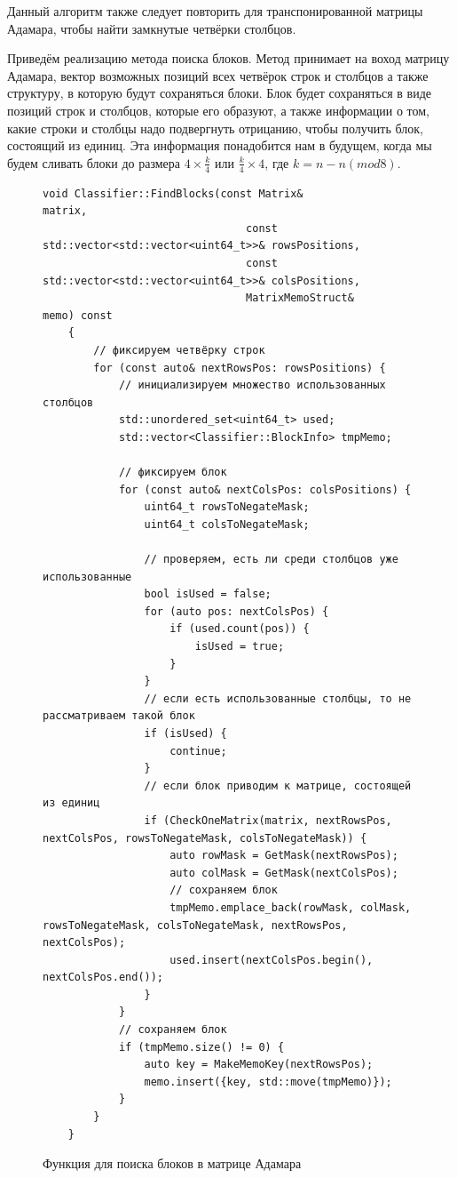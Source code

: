 \documentclass[a4paper, 14pt]{extreport}
\begin{document}
Данный алгоритм также следует повторить для транспонированной матрицы Адамара, чтобы найти замкнутые четвёрки столбцов.

Приведём реализацию метода поиска блоков. Метод принимает на воход матрицу Адамара, вектор возможных позиций всех четвёрок строк и столбцов а также структуру, в которую будут сохраняться блоки. Блок будет сохраняться в виде позиций строк и столбцов, которые его образуют, а также информации о том, какие строки и столбцы надо подвергнуть отрицанию, чтобы получить блок, состоящий из единиц. Эта информация понадобится нам в будущем, когда мы будем сливать блоки до размера $4 \times \frac{k}{4}$ или $\frac{k}{4} \times 4$, где $k = n - n(mod8)$.
\begin{figure}[H]
    \centering
    \begin{minipage}{\linewidth}
    \begin{lstlisting}[language=С++, tabsize=4, showspaces=false, basicstyle=\fontsize{9.5}{11.5}\selectfont, numbers=none]
    void Classifier::FindBlocks(const Matrix&                             matrix,
                                const std::vector<std::vector<uint64_t>>& rowsPositions,
                                const std::vector<std::vector<uint64_t>>& colsPositions,
                                MatrixMemoStruct&                         memo) const
    {
        // фиксируем четвёрку строк
        for (const auto& nextRowsPos: rowsPositions) {
            // инициализируем множество использованных столбцов
            std::unordered_set<uint64_t> used;
            std::vector<Classifier::BlockInfo> tmpMemo;
    
            // фиксируем блок
            for (const auto& nextColsPos: colsPositions) {
                uint64_t rowsToNegateMask;
                uint64_t colsToNegateMask;
    
                // проверяем, есть ли среди столбцов уже использованные
                bool isUsed = false;
                for (auto pos: nextColsPos) {
                    if (used.count(pos)) {
                        isUsed = true;
                    }
                }
                // если есть использованные столбцы, то не рассматриваем такой блок
                if (isUsed) {
                    continue;
                }
                // если блок приводим к матрице, состоящей из единиц
                if (CheckOneMatrix(matrix, nextRowsPos, nextColsPos, rowsToNegateMask, colsToNegateMask)) {
                    auto rowMask = GetMask(nextRowsPos);
                    auto colMask = GetMask(nextColsPos);
                    // сохраняем блок
                    tmpMemo.emplace_back(rowMask, colMask, rowsToNegateMask, colsToNegateMask, nextRowsPos, nextColsPos);
                    used.insert(nextColsPos.begin(), nextColsPos.end());
                }
            }
            // сохраняем блок
            if (tmpMemo.size() != 0) {
                auto key = MakeMemoKey(nextRowsPos);
                memo.insert({key, std::move(tmpMemo)});
            }
        }
    }
    \end{lstlisting}
    \end{minipage}
    \caption{Функция для поиска блоков в матрице Адамара}
    \label{alg:blocks_finder}
\end{figure}
\end{document}
